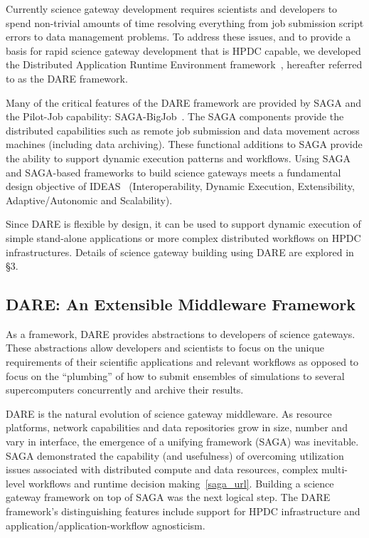 \documentclass[]{svjour3}
\begin{document}
Currently science gateway development requires scientists and
developers to spend non-trivial amounts of time resolving everything
from job submission script errors to data management problems. To
address these issues, and to provide a basis for rapid science gateway
development that is HPDC capable, we developed the Distributed
Application Runtime Environment framework~\cite{dareurl}, hereafter
referred to as the DARE framework.

Many of the critical features of the DARE framework are provided by
SAGA and the Pilot-Job capability:
SAGA-BigJob~\cite{saga_bigjob_condor_cloud}.  The SAGA components
provide the distributed capabilities such as remote job submission and
data movement across machines (including data archiving).  These
functional additions to SAGA provide the ability to support dynamic
execution patterns and workflows. Using SAGA and SAGA-based frameworks
to build science gateways meets a fundamental design objective of
IDEAS~\cite{ideas} (Interoperability, Dynamic Execution,
Extensibility, Adaptive/Autonomic and Scalability).
 
Since DARE is flexible by design, it can be used to support dynamic
execution of simple stand-alone applications or more complex
distributed workflows on HPDC infrastructures. Details of science
gateway building using DARE are explored in \S3.

\subsection{DARE: An Extensible Middleware Framework}

As a framework, DARE provides abstractions to developers of science
gateways. These abstractions allow developers and scientists to focus
on the unique requirements of their scientific applications and
relevant workflows as opposed to focus on the ``plumbing'' of how to
submit ensembles of simulations to several supercomputers concurrently
and archive their results.

DARE is the natural evolution of science gateway middleware. As
resource platforms, network capabilities and data repositories grow in
size, number and vary in interface, the emergence of a unifying
framework (SAGA) was inevitable. SAGA demonstrated the capability
(and usefulness) of overcoming utilization issues associated with
distributed compute and data resources, complex multi-level workflows
and runtime decision making~\ref{saga_url}. Building a science gateway framework on
top of SAGA was the next logical step. The DARE framework's
distinguishing features include support for HPDC infrastructure and
application/application-workflow agnosticism.
\end{document}
